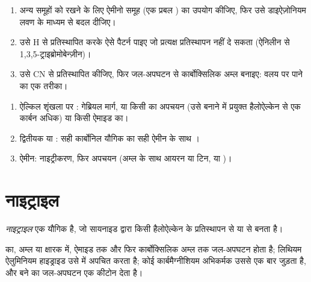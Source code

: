 \begin{method}\label{met:b2:amines:diazonium-routes}
\begin{enumerate}
  \item अन्य समूहों को रखने के लिए ऐमीनो समूह (एक प्रबल ) का उपयोग कीजिए, फिर उसे
        डाइऐज़ोनियम लवण के माध्यम से बदल दीजिए।
  \item उसे H से प्रतिस्थापित करके ऐसे पैटर्न पाइए जो प्रत्यक्ष प्रतिस्थापन नहीं दे सकता
        (ऐनिलीन से 1,3,5-ट्राइब्रोमोबेन्ज़ीन)।
  \item उसे CN से प्रतिस्थापित कीजिए, फिर जल-अपघटन से कार्बोक्सिलिक अम्ल बनाइए: वलय पर  पाने का एक तरीका।
\end{enumerate}
\end{method}

\begin{method}[ऐमीन बनाना]\label{met:b2:amines:make-amine}
\begin{enumerate}
  \item ऐल्किल शृंखला पर : गेब्रियल मार्ग, या किसी  का अपचयन (उसे बनाने में प्रयुक्त
        हैलोऐल्केन से एक कार्बन अधिक) या किसी ऐमाइड का।
  \item द्वितीयक या : सही कार्बोनिल यौगिक का सही ऐमीन के साथ
        ।
  \item {} ऐमीन: नाइट्रीकरण, फिर अपचयन (अम्ल के साथ आयरन या टिन, या )।
\end{enumerate}
\end{method}

\section{नाइट्राइल}

\begin{definition}[नाइट्राइल]\label{def:b2:amines:nitrile}
\emph{नाइट्राइल} एक यौगिक  है, जो सायनाइड द्वारा किसी हैलोऐल्केन के प्रतिस्थापन से
या  से बनता है।
\end{definition}

\begin{proposition}[नाइट्राइलों की अभिक्रियाएँ]\label{prop:b2:amines:nitrile}
 का, अम्ल या क्षारक में, ऐमाइड तक और फिर कार्बोक्सिलिक अम्ल तक जल-अपघटन होता है; लिथियम
ऐलुमिनियम हाइड्राइड उसे   में अपचित करता है; कोई कार्बमैग्नीशियम
अभिकर्मक उससे एक बार जुड़ता है, और बने  का जल-अपघटन एक कीटोन देता है।
\end{proposition}

